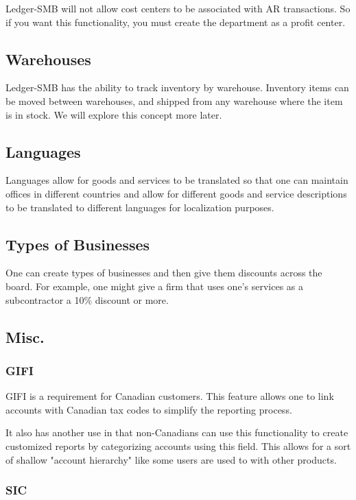 \documentclass{article}
\begin{document}
Ledger-SMB will not allow cost centers to be associated with AR transactions.
So if you want this functionality, you must create the department as a profit
center.

\subsection{Warehouses}

Ledger-SMB has the ability to track inventory by warehouse.  Inventory items can
be moved between warehouses, and shipped from any warehouse where the item is in
stock.  We will explore this concept more later.

\subsection{Languages}
Languages allow for goods and services to be translated so that one can 
maintain offices in different countries and allow for different goods and
service descriptions to be translated to different languages for localization
purposes.

\subsection{Types of Businesses}
One can create types of businesses and then give them discounts across the
board.  For example, one might give a firm that uses one's services as a
subcontractor a 10\% discount or more.

\subsection{Misc.}
\subsubsection{GIFI}

GIFI is a requirement for Canadian customers.  This feature allows one to link
accounts with Canadian tax codes to simplify the reporting process.

It also has another use in that non-Canadians can use this functionality to
create customized reports by categorizing accounts using this field.  This
allows for a sort of shallow "account hierarchy" like some users are used to
with other products.

\subsubsection{SIC}
\end{document}
